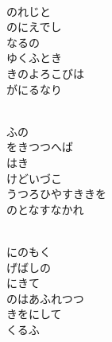 \documentclass[10pt,b5j]{tarticle} %
\begin{document}
\vspace{1.5em} %
\newcommand{\linespace}{0.5em} %
\newcommand{\blocksize}{0.5\hsize} %
\newcommand{\itemmargin}{6em} %
\begin{enumerate} %
    \setlength{\itemindent}{\itemmargin} %
    \begin{minipage}[c]{\blocksize}
    
        \vspace{\linespace}
        \item~\\
        のれじと\\
        のにえでし\\
        なるの\\
        ゆくふとき\\
        きのよろこびは\\
        がにるなり
        
        \vspace{\linespace}
        \item~\\
        ふの\\
        をきつつへば\\
        はき\\
        けどいづこ\\
        うつろひやすききを\\
        のとなすなかれ
        
        \vspace{\linespace}
        \item~\\
        にのもく\\
        げばしの\\
        にきて\\
        のはあふれつつ\\
        きをにして\\
        くるふ
        

\end{minipage}
\end{enumerate}
\end{document}
